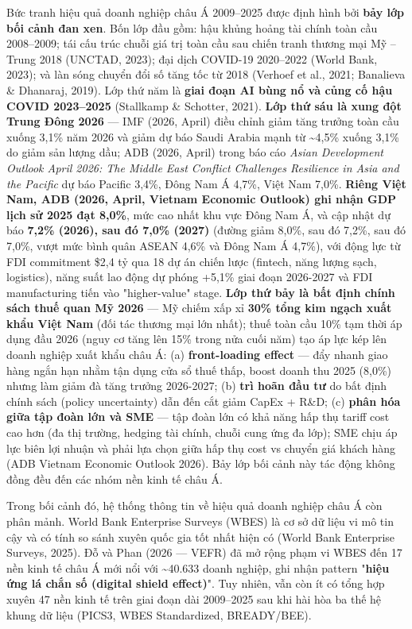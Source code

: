 \documentclass[12pt,a4paper]{article}
\begin{document}
Bức tranh hiệu quả doanh nghiệp châu Á 2009--2025 được định hình bởi
\textbf{bảy lớp bối cảnh đan xen}. Bốn lớp đầu gồm: hậu khủng hoảng tài
chính toàn cầu 2008--2009; tái cấu trúc chuỗi giá trị toàn cầu sau chiến
tranh thương mại Mỹ -- Trung 2018 (UNCTAD, 2023); đại dịch COVID-19
2020--2022 (World Bank, 2023); và làn sóng chuyển đổi số tăng tốc từ
2018 (Verhoef et al., 2021; Banalieva \& Dhanaraj, 2019). Lớp thứ năm là
\textbf{giai đoạn AI bùng nổ và củng cố hậu COVID 2023--2025} (Stallkamp
\& Schotter, 2021). \textbf{Lớp thứ sáu là xung đột Trung Đông 2026} ---
IMF (2026, April) điều chỉnh giảm tăng trưởng toàn cầu xuống 3,1\% năm
2026 và giảm dự báo Saudi Arabia mạnh từ \textasciitilde4,5\% xuống
3,1\% do giảm sản lượng dầu; ADB (2026, April) trong báo cáo \emph{Asian
Development Outlook April 2026: The Middle East Conflict Challenges
Resilience in Asia and the Pacific} dự báo Pacific 3,4\%, Đông Nam Á
4,7\%, Việt Nam 7,0\%. \textbf{Riêng Việt Nam, ADB (2026, April, Vietnam
Economic Outlook) ghi nhận GDP lịch sử 2025 đạt 8,0\%}, mức cao nhất khu
vực Đông Nam Á, và cập nhật dự báo \textbf{7,2\% (2026), sau đó 7,0\%
(2027)} (đường giảm 8,0\%, sau đó 7,2\%, sau đó 7,0\%, vượt mức bình
quân ASEAN 4,6\% và Đông Nam Á 4,7\%), với động lực từ FDI commitment
\$2,4 tỷ qua 18 dự án chiến lược (fintech, năng lượng sạch, logistics),
năng suất lao động dự phóng +5,1\% giai đoạn 2026-2027 và FDI
manufacturing tiến vào "higher-value" stage. \textbf{Lớp thứ bảy là bất
định chính sách thuế quan Mỹ 2026} --- Mỹ chiếm xấp xỉ \textbf{30\% tổng
kim ngạch xuất khẩu Việt Nam} (đối tác thương mại lớn nhất); thuế toàn
cầu 10\% tạm thời áp dụng đầu 2026 (nguy cơ tăng lên 15\% trong nửa cuối
năm) tạo áp lực kép lên doanh nghiệp xuất khẩu châu Á: (a)
\textbf{front-loading effect} --- đẩy nhanh giao hàng ngắn hạn nhằm tận
dụng cửa sổ thuế thấp, boost doanh thu 2025 (8,0\%) nhưng làm giảm đà
tăng trưởng 2026-2027; (b) \textbf{trì hoãn đầu tư} do bất định chính
sách (policy uncertainty) dẫn đến cắt giảm CapEx + R\&D; (c)
\textbf{phân hóa giữa tập đoàn lớn và SME} --- tập đoàn lớn có khả năng
hấp thụ tariff cost cao hơn (đa thị trường, hedging tài chính, chuỗi
cung ứng đa lớp); SME chịu áp lực biên lợi nhuận và phải lựa chọn giữa
hấp thụ cost vs chuyển giá khách hàng (ADB Vietnam Economic Outlook
2026). Bảy lớp bối cảnh này tác động không đồng đều đến các nhóm nền
kinh tế châu Á.

Trong bối cảnh đó, hệ thống thông tin về hiệu quả doanh nghiệp châu Á
còn phân mảnh. World Bank Enterprise Surveys (WBES) là cơ sở dữ liệu vi
mô tin cậy và có tính so sánh xuyên quốc gia tốt nhất hiện có (World
Bank Enterprise Surveys, 2025). Đỗ và Phan (2026 --- VEFR) đã mở rộng
phạm vi WBES đến 17 nền kinh tế châu Á mới nổi với \textasciitilde40.633
doanh nghiệp, ghi nhận pattern "\textbf{hiệu ứng lá chắn số (digital
shield effect)}". Tuy nhiên, vẫn còn ít có tổng hợp xuyên 47 nền kinh tế
trên giai đoạn dài 2009--2025 sau khi hài hòa ba thế hệ khung dữ liệu
(PICS3, WBES Standardized, BREADY/BEE).
\end{document}
